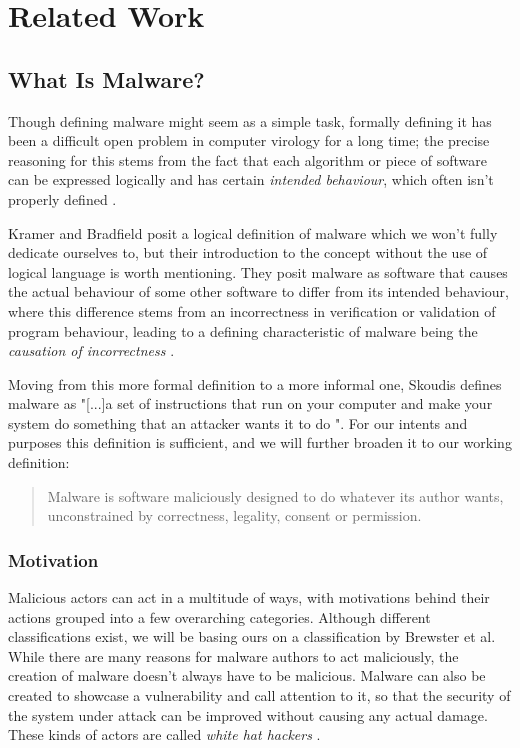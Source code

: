 \chapter{Related Work}
\section{What Is Malware?} \label{sec:malware}
Though defining malware might seem as a simple task, formally defining it has been a difficult open problem in 
computer virology for a long time; the precise reasoning for this stems from the fact that each algorithm or
piece of software can be expressed logically and has certain \emph{intended behaviour}, which often isn't
properly defined \cite{malware-definition}. 

Kramer and Bradfield posit a logical definition of malware which we won't fully dedicate ourselves to, but their 
introduction to the concept without the use of logical language is worth mentioning. 
They posit malware as software that causes the actual behaviour of some other software to differ from its intended behaviour, 
where this difference stems from an incorrectness in verification or validation of program behaviour, leading to a 
defining characteristic of malware being the \emph{causation of incorrectness} \cite{malware-definition}. 

Moving from this more formal definition to a more informal one, Skoudis defines malware as "[...]a set of instructions that 
run on your computer and make your system do something that an attacker wants it to do \cite{skoudis-book}". For our
intents and purposes this definition is sufficient, and we will further broaden it to our working definition:
\begin{quote}
  Malware is software maliciously designed to do whatever its author wants, unconstrained by correctness, legality, 
  consent or permission.
\end{quote}

\subsection{Motivation}
Malicious actors can act in a multitude of ways, with motivations behind their actions grouped into a few overarching
categories. Although different classifications exist, we will be basing ours on a classification by Brewster et al.
While there are many reasons for malware authors to act maliciously, the creation of malware doesn't always have
to be malicious. Malware can also be created to showcase a vulnerability and call attention to it, so that the 
security of the system  under attack can be improved without causing any actual damage. These kinds of actors are 
called \emph{white hat hackers} \cite{white-hat-hacking-definition}.


